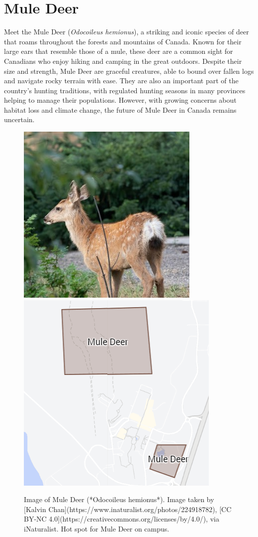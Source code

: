 \documentclass[
]{book}
\begin{document}
\hypertarget{mule-deer}{%
\section{Mule Deer}\label{mule-deer}}

Meet the Mule Deer (\emph{Odocoileus hemionus}), a striking and iconic species of deer that roams throughout the forests and mountains of Canada. Known for their large ears that resemble those of a mule, these deer are a common sight for Canadians who enjoy hiking and camping in the great outdoors. Despite their size and strength, Mule Deer are graceful creatures, able to bound over fallen logs and navigate rocky terrain with ease. They are also an important part of the country's hunting traditions, with regulated hunting seasons in many provinces helping to manage their populations. However, with growing concerns about habitat loss and climate change, the future of Mule Deer in Canada remains uncertain.

\begin{figure}

{\centering \includegraphics[width=0.49\linewidth,height=0.2\textheight]{animal_images/deer_11} \includegraphics[width=0.49\linewidth,height=0.2\textheight]{animal_images/deer_hotspot_11} 

}

\caption{Image of Mule Deer (*Odocoileus hemionus*). Image taken by [Kalvin Chan](https://www.inaturalist.org/photos/224918782), [CC BY-NC 4.0](https://creativecommons.org/licenses/by/4.0/), via iNaturalist. Hot spot for Mule Deer on campus.}\label{fig:unnamed-chunk-5}
\end{figure}
\end{document}
